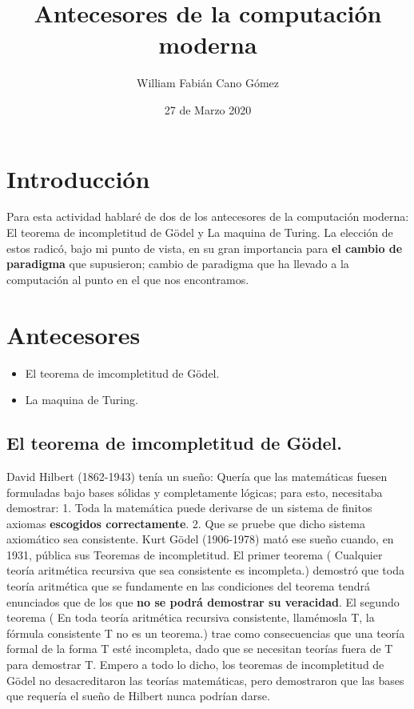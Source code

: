 \documentclass[12pt]{article}
\title{Antecesores de la computación moderna}
\author{William Fabián Cano Gómez}
\date{27 de Marzo 2020}
\begin{document}
\maketitle
\tableofcontents
\section{Introducción}

Para esta actividad hablaré de dos de los antecesores de la computación moderna: El teorema de incompletitud de Gödel y La maquina de Turing.
\newline 
La elección de estos radicó, bajo mi punto de vista, en su gran importancia para \textbf{el cambio de paradigma} que supusieron; cambio de paradigma que ha llevado a la computación al punto en el que nos encontramos.

\section{Antecesores}
\begin{itemize}
  \item El teorema de imcompletitud de Gödel.
  \item La maquina de Turing.
\end{itemize}

\subsection {El teorema de imcompletitud de Gödel.}
David Hilbert (1862-1943) tenía un sueño: Quería que las matemáticas fuesen formuladas bajo bases sólidas y completamente lógicas; para esto, necesitaba demostrar: 1. Toda la matemática puede derivarse de un sistema de finitos axiomas \textbf{escogidos correctamente}. 2. Que se pruebe que dicho sistema axiomático sea consistente.
\newline
Kurt Gödel (1906-1978) mató ese sueño cuando, en 1931, pública sus Teoremas de incompletitud.
\newline
El primer teorema ( Cualquier teoría aritmética recursiva que sea consistente es incompleta.) demostró que toda teoría aritmética que se fundamente en las condiciones del teorema tendrá enunciados que de los que \textbf{no se podrá demostrar su veracidad}.
\newline
El segundo teorema ( En toda teoría aritmética recursiva consistente, llamémosla T, la fórmula consistente T no es un teorema.) trae como consecuencias que una teoría formal de la forma T esté incompleta, dado que se necesitan teorías fuera de T para demostrar T.
\newline
Empero a todo lo dicho, los teoremas de incompletitud de Gödel no desacreditaron las teorías matemáticas, pero demostraron que las bases que requería el sueño de Hilbert nunca podrían darse.
\end{document}
